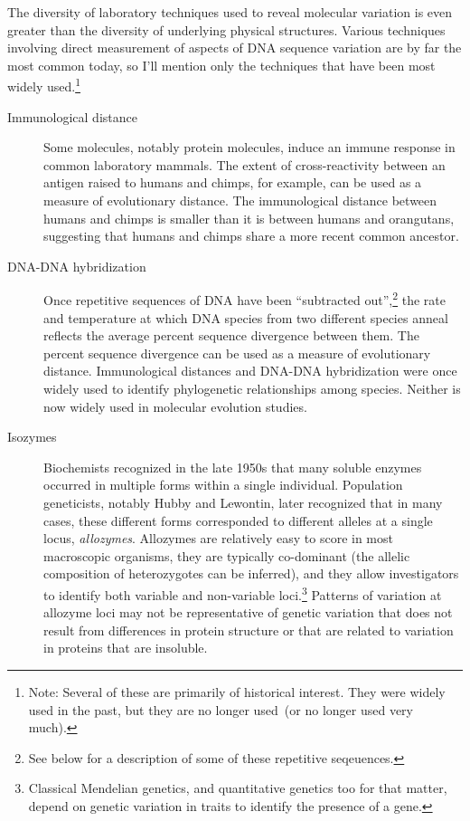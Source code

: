 The diversity of laboratory techniques used to reveal molecular
variation is even greater than the diversity of underlying physical
structures. Various techniques involving direct measurement of aspects
of DNA sequence variation are by far the most common today, so I'll
mention only the techniques that have been most widely
used.\footnote{Note: Several of these are primarily of historical
  interest. They were widely used in the past, but they are no longer
  used~(or no longer used very much).}

\begin{description}

\item[Immunological distance] Some molecules, notably protein
  molecules, induce an immune response in common laboratory
  mammals. The extent of cross-reactivity between an antigen raised to
  humans and chimps, for example, can be used as a measure of
  evolutionary distance. The immunological distance between humans and
  chimps is smaller than it is between humans and orangutans,
  suggesting that humans and chimps share a more recent common
  ancestor.

\item[DNA-DNA hybridization] Once repetitive sequences of DNA have
  been ``subtracted out'',\footnote{See below for a description of
    some of these repetitive seqeuences.} the rate and temperature at
  which DNA species from two different species anneal reflects the
  average percent sequence divergence between them. The percent
  sequence divergence can be used as a measure of evolutionary
  distance. Immunological distances and DNA-DNA hybridization were
  once widely used to identify phylogenetic relationships among
  species. Neither is now widely used in molecular evolution
  studies.

\item[Isozymes] Biochemists recognized in the late 1950s that many
  soluble enzymes occurred in multiple forms within a single
  individual. Population geneticists, notably Hubby and Lewontin, later
  recognized that in many cases, these different forms corresponded to
  different alleles at a single locus, {\it allozymes}. Allozymes are
  relatively easy to score in most macroscopic organisms, they are
  typically co-dominant (the allelic composition of heterozygotes can
  be inferred), and they allow investigators to identify both variable
  and non-variable loci.\footnote{Classical Mendelian genetics, and
    quantitative genetics too for that matter, depend on genetic
    variation in traits to identify the presence of a gene.} Patterns
  of variation at allozyme loci may not be representative of genetic
  variation that does not result from differences in protein structure
  or that are related to variation in proteins that are
  insoluble.


\end{description}
